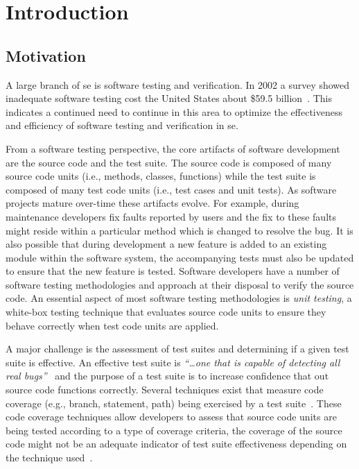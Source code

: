 \chapter{Introduction}
\label{chap:introduction}


\section{Motivation}
\label{sec:introduction_motivation}
A large branch of \gls{se} is software testing and verification. In 2002 a survey showed inadequate software testing cost the United States about \$59.5 billion~\cite{RTI02}. This indicates a continued need to continue in this area to optimize the effectiveness and efficiency of software testing and verification in \gls{se}.

From a software testing perspective, the core artifacts of software development are the source code and the test suite. The source code is composed of many source code units (i.e., methods, classes, functions) while the test suite is composed of many test code units (i.e., test cases and unit tests). As software projects mature over-time these artifacts evolve. For example, during maintenance developers fix faults reported by users and the fix to these faults might reside within a particular method which is changed to resolve the bug. It is also possible that during development a new feature is added to an existing module within the software system, the accompanying tests must also be updated to ensure that the new feature is tested. Software developers have a number of software testing methodologies and approach at their disposal to verify the source code. An essential aspect of most software testing methodologies is \emph{unit testing}, a white-box testing technique that evaluates source code units to ensure they behave correctly when test code units are applied.

A major challenge is the assessment of test suites and determining if a given test suite is effective. An effective test suite is \emph{``\ldots one that is capable of detecting all real bugs''}~\cite{Wey93} and the purpose of a test suite is to increase confidence that out source code functions correctly. Several techniques exist that measure code coverage (e.g., branch, statement, path) being exercised by a test suite~\cite{ZHM97}. These code coverage techniques allow developers to assess that source code units are being tested according to a type of coverage criteria, the coverage of the source code might not be an adequate indicator of test suite effectiveness depending on the technique used~\cite{NA09,GJ08}.

